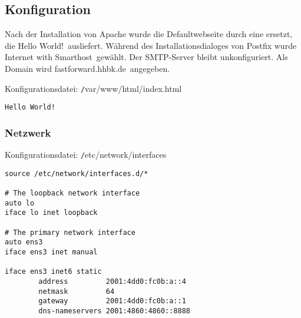 \subsection{Konfiguration}

Nach der Installation von Apache wurde die Defaultwebseite durch eine ersetzt, die \ql Hello World!\qr\ ausliefert. Während des Installationsdialoges von Postfix wurde \ql Internet with Smarthost\qr\ gewählt. Der SMTP-Server bleibt unkonfiguriert. Als Domain wird \ql fastforward.hhbk.de\qr\ angegeben.\newline

Konfigurationsdatei: {\texttt /var/www/html/index.html}
\begin{lstlisting}
Hello World!
\end{lstlisting}

\newpage
\subsubsection{Netzwerk}

Konfigurationsdatei: {\texttt /etc/network/interfaces}
\begin{lstlisting}
source /etc/network/interfaces.d/*

# The loopback network interface
auto lo
iface lo inet loopback

# The primary network interface
auto ens3
iface ens3 inet manual

iface ens3 inet6 static
        address			2001:4dd0:fc0b:a::4
        netmask			64
        gateway			2001:4dd0:fc0b:a::1
        dns-nameservers	2001:4860:4860::8888
\end{lstlisting}

